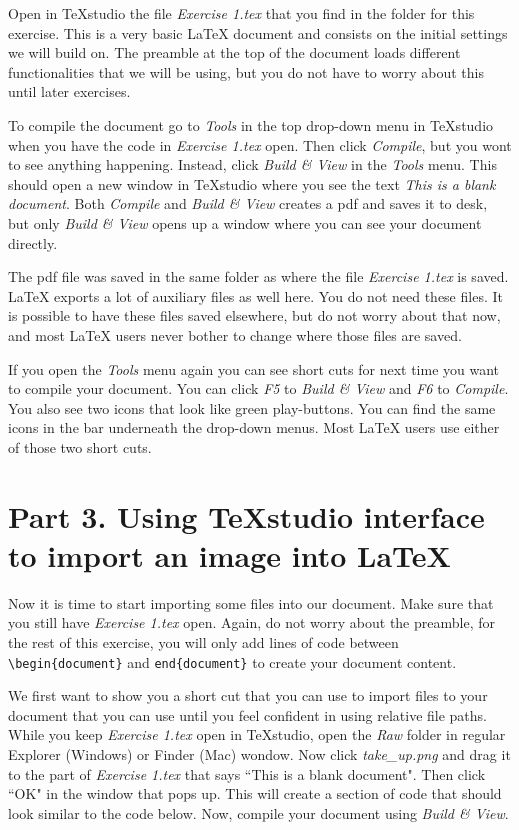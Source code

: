 \documentclass[12pts]{report}
\begin{document}
Open in TeXstudio the file \emph{Exercise 1.tex} that you find in the folder for this exercise. This is a very basic {\LaTeX} document and consists on the initial settings we will build on. The preamble at the top of the document loads different functionalities that we will be using, but you do not have to worry about this until later exercises.

To compile the document go to \emph{Tools} in the top drop-down menu in TeXstudio when you have the code in \emph{Exercise 1.tex} open. Then click \emph{Compile}, but you wont to see anything happening. Instead, click \emph{Build \& View} in the \emph{Tools} menu. This should open a new window in TeXstudio where you see the text \emph{This is a blank document}. Both \emph{Compile} and \emph{Build \& View} creates a pdf and saves it to desk, but only \emph{Build \& View} opens up a window where you can see your document directly. 

The pdf file was saved in the same folder as where the file \emph{Exercise 1.tex} is saved. {\LaTeX} exports a lot of auxiliary files as well here. You do not need these files. It is possible to have these files saved elsewhere, but do not worry about that now, and most {\LaTeX} users never bother to change where those files are saved.

If you open the \emph{Tools} menu again you can see short cuts for next time you want to compile your document. You can click \emph{F5} to \emph{Build \& View} and \emph{F6} to \emph{Compile}. You also see two icons that look like green play-buttons. You can find the same icons in the bar underneath the drop-down menus. Most {\LaTeX} users use either of those two short cuts.

\section*{Part 3. Using TeXstudio interface to import an image into \LaTeX}
Now it is time to start importing some files into our document. Make sure that you still have \emph{Exercise 1.tex} open. Again, do not worry about the preamble, for the rest of this exercise, you will only add lines of code between \verb|\begin{document}| and \verb|end{document}| to create your document content.

We first want to show you a short cut that you can use to import files to your document that you can use until you feel confident in using relative file paths. While you keep \emph{Exercise 1.tex} open in TeXstudio, open the \emph{Raw} folder in regular Explorer (Windows) or Finder (Mac) wondow. Now click \emph{take\_up.png} and drag it to the part of \emph{Exercise 1.tex} that says ``This is a blank document". Then click ``OK" in the window that pops up. This will create a section of code that should look similar to the code below. Now, compile your document using \emph{Build \& View}.
\end{document}
